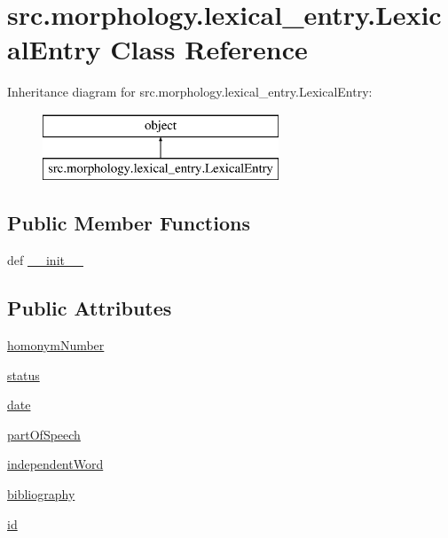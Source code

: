 \hypertarget{classsrc_1_1morphology_1_1lexical__entry_1_1_lexical_entry}{\section{src.\+morphology.\+lexical\+\_\+entry.\+Lexical\+Entry Class Reference}
\label{classsrc_1_1morphology_1_1lexical__entry_1_1_lexical_entry}
}
Inheritance diagram for src.\+morphology.\+lexical\+\_\+entry.\+Lexical\+Entry\+:\begin{figure}[H]
\begin{center}
\leavevmode
\includegraphics[height=2.000000cm]{classsrc_1_1morphology_1_1lexical__entry_1_1_lexical_entry}
\end{center}
\end{figure}
\subsection*{Public Member Functions}
\begin{DoxyCompactItemize}
\item 
def \hyperlink{classsrc_1_1morphology_1_1lexical__entry_1_1_lexical_entry_ade6578b5a16cc64924af0911fe2c03e1}{\+\_\+\+\_\+init\+\_\+\+\_\+}
\end{DoxyCompactItemize}
\subsection*{Public Attributes}
\begin{DoxyCompactItemize}
\item 
\hyperlink{classsrc_1_1morphology_1_1lexical__entry_1_1_lexical_entry_a10efca66a6d3066da5a9d6335055a90c}{homonym\+Number}
\item 
\hyperlink{classsrc_1_1morphology_1_1lexical__entry_1_1_lexical_entry_a998ec543b526f78f773be3add318e898}{status}
\item 
\hyperlink{classsrc_1_1morphology_1_1lexical__entry_1_1_lexical_entry_a81adbcf29b6f46f2dfc0b0d70c76976a}{date}
\item 
\hyperlink{classsrc_1_1morphology_1_1lexical__entry_1_1_lexical_entry_adf76c7a533c3ee416d7f78952a0b5921}{part\+Of\+Speech}
\item 
\hyperlink{classsrc_1_1morphology_1_1lexical__entry_1_1_lexical_entry_a6c28ee96aa864b03c7b7ec1e7a7490cf}{independent\+Word}
\item 
\hyperlink{classsrc_1_1morphology_1_1lexical__entry_1_1_lexical_entry_a72d10a31d12a48da2afbc21a68acb61a}{bibliography}
\item 
\hyperlink{classsrc_1_1morphology_1_1lexical__entry_1_1_lexical_entry_aad3078c80b6b064a508751c4a5252fb1}{id}
\end{DoxyCompactItemize}


